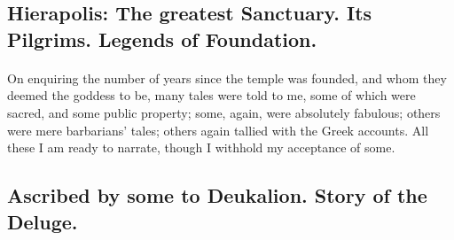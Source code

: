 \documentclass[a4paper, 11pt, oneside, polutonikogreek, english]{article}
\begin{document}
\subsection{Hierapolis: The greatest Sanctuary. Its Pilgrims. Legends of Foundation.}
\paragraph{}
On enquiring the number of years since the temple was founded, and whom they deemed the goddess to be, many tales were told to me, some of which were sacred, and some public property; some, again, were absolutely fabulous; others were mere barbarians' tales; others again tallied with the Greek accounts. All these I am ready to narrate, though I withhold my acceptance of some.

\subsection{Ascribed by some to Deukalion. Story of the Deluge.}
\end{document}
